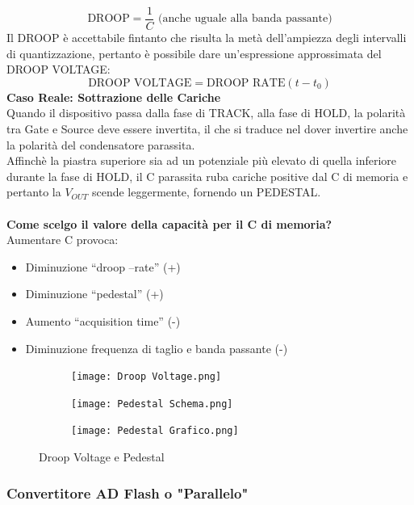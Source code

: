 \documentclass{article}
\begin{document}
\begin{equation}
   \text{DROOP}=\frac{1}{C} \text{   (anche uguale alla banda passante)}
\end{equation}
Il DROOP è accettabile fintanto che risulta la metà dell'ampiezza degli intervalli di quantizzazione, pertanto è possibile dare un'espressione approssimata del DROOP VOLTAGE:
\begin{equation}
    \text{DROOP VOLTAGE}=\text{DROOP RATE}(t-t_{0})
\end{equation}
\textbf{Caso Reale: Sottrazione delle Cariche}\\
Quando il dispositivo passa dalla fase di TRACK, alla fase di HOLD, la polarità tra Gate e Source deve essere invertita, il che si traduce nel dover invertire anche la polarità del condensatore parassita.\\
Affinchè la piastra superiore sia ad un potenziale più elevato di quella inferiore durante la fase di HOLD, il C parassita ruba cariche positive dal C di memoria e pertanto la $V_{OUT}$ scende leggermente, fornendo un PEDESTAL.\\\\
\textbf{Come scelgo il valore della capacità per il C di memoria?}\\
Aumentare C provoca:
\begin{itemize}
    \item Diminuzione “droop –rate”  (+)
    \item Diminuzione “pedestal” (+)
    \item Aumento “acquisition time” (-)
    \item Diminuzione frequenza di taglio e banda passante (-)
\end{itemize}
\begin{figure}
\begin{subfigure}
   \centering
    \texttt{[image: Droop Voltage.png]}
    \label{fig:droop Voltage}
\end{subfigure}
  \hfill
  \begin{subfigure}
     \centering
    \texttt{[image: Pedestal Schema.png]}
    \label{fig:pedestal schema}
  \end{subfigure}
  \hfill
 \begin{subfigure}
    \centering
    \texttt{[image: Pedestal Grafico.png]}
    \label{fig:pedestal grafico}
 \end{subfigure}
 \caption{Droop Voltage e Pedestal}
  \label{fig:droop}
\end{figure}
\subsubsection{Convertitore AD Flash o "Parallelo"}
\end{document}
